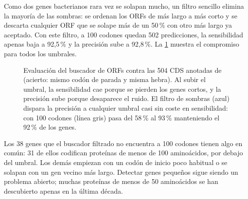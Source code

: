 Como dos genes bacterianos rara vez se solapan mucho, un filtro sencillo elimina la mayoría de las sombras: se ordenan los ORFs de más largo a más corto y se descarta cualquier ORF que se solape más de un 50\,\% con otro más largo ya aceptado. Con este filtro, a 100 codones quedan 502 predicciones, la sensibilidad apenas baja a 92,5\,\% y la precisión sube a 92,8\,\%. La \cref{fig:01-sensprec} muestra el compromiso para todos los umbrales.

\begin{figure}[t]
\centering
{}
\caption[Sensibilidad y precisión del buscador de ORFs]{Evaluación del buscador de ORFs contra las 504 CDS anotadas de  (acierto: mismo codón de parada y misma hebra). Al subir el umbral, la sensibilidad cae porque se pierden los genes cortos, y la precisión sube porque desaparece el ruido. El filtro de sombras (azul) dispara la precisión a cualquier umbral casi sin coste en sensibilidad: con 100 codones (línea gris) pasa del 58\,\% al 93\,\% manteniendo el 92\,\% de los genes.}
\label{fig:01-sensprec}
\end{figure}

Los 38 genes que el buscador filtrado no encuentra a 100 codones tienen algo en común: 31 de ellos codifican proteínas de menos de 100 aminoácidos, por debajo del umbral. Los demás empiezan con un codón de inicio poco habitual o se solapan con un gen vecino más largo. Detectar genes pequeños sigue siendo un problema abierto; muchas proteínas de menos de 50 aminoácidos se han descubierto apenas en la última década.

